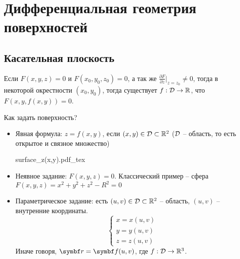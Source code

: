 \documentclass[main]{subfiles}
\begin{document}
\chapter{Дифференциальная геометрия поверхностей}
\section{Касательная плоскость}
\begin{theorem*}
    Если $F(x,y,z) = 0$ и $F(x_0, y_0,z_0) = 0$,
    а так же $\frac{\partial F}{\partial z}\rvert_{z = z_0} \neq 0$,
    тогда в некоторой окрестности $(x_0, y_0)$,
    тогда существует $f: \mathcal{D} \to \mathbb{R}$, что $F(x, y, f(x,y)) =0$.
\end{theorem*}

Как задать поверхность?
\begin{itemize}
    \item Явная формула: $z = f(x,y)$, если $(x,y) \in \mathcal{D} \subset \mathbb{R}^2$
          ($\mathcal{D}$ -- область, то есть открытое и связное множество)
          \begin{center}
              {surface_z(x,y).pdf_tex}
          \end{center}
    \item Неявное задание: $F(x,y,z) = 0$. Классический пример -- сфера
          $F(x,y,z)=x^2 + y^2 + z^2 - R^2 = 0$
    \item Параметрическое задание:
          есть $(u,v) \in \mathcal{D} \subset \mathbb{R}^2$ -- область,
          $(u,v)$ -- внутренние координаты.
          \[\begin{cases}
                  x = x(u,v) \\
                  y = y(u,v) \\
                  z = z(u,v)
              \end{cases}\]
          Иначе говоря, $\vr = \vf(u,v)$, где $f: \mathcal{D} \to \mathbb{R}^3$.
\end{itemize}
\end{document}
